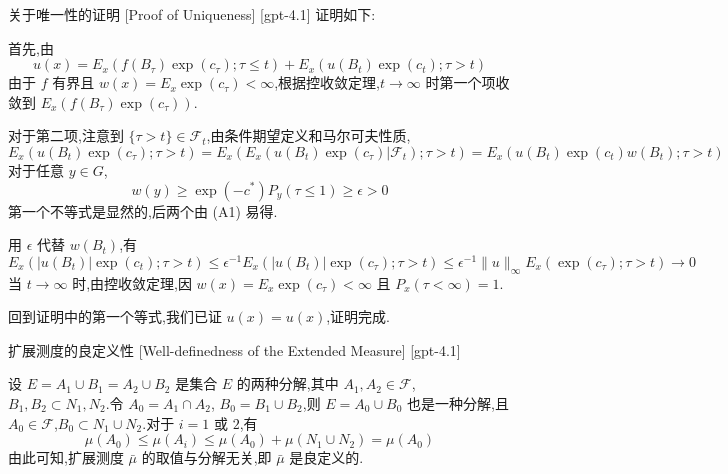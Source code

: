 \documentclass[UTF8]{ctexart}
\begin{document}
    
    
    \begin{prf}
        {关于唯一性的证明}
        [Proof of Uniqueness]
        [gpt-4.1]
        证明如下:

首先,由
\[
u ( x ) = E _ { x } ( f ( B _ { \tau } ) \exp ( c _ { \tau } ) ; \tau \leq t ) + E _ { x } ( u ( B _ { t } ) \exp ( c _ { t } ) ; \tau > t )
\]
由于 $f$ 有界且 $w(x) = E_x \exp(c_{\tau}) < \infty$,根据控收敛定理,$t \to \infty$ 时第一个项收敛到 $E_x (f(B_\tau) \exp(c_\tau))$.

对于第二项,注意到 $\{\tau > t\} \in \mathcal{F}_t$,由条件期望定义和马尔可夫性质,
\[
E_x(u(B_t)\exp(c_\tau); \tau > t) = E_x(E_x(u(B_t)\exp(c_\tau)|\mathcal{F}_t); \tau > t) = E_x(u(B_t)\exp(c_t)w(B_t); \tau > t)
\]
对于任意 $y \in G$,
\[
w(y) \geq \exp(-c^*) P_y(\tau \leq 1) \geq \epsilon > 0
\]
第一个不等式是显然的,后两个由 (A1) 易得.

用 $\epsilon$ 代替 $w(B_t)$,有
\[
E_x(|u(B_t)|\exp(c_t); \tau > t) \leq \epsilon^{-1} E_x(|u(B_t)|\exp(c_\tau); \tau > t) \leq \epsilon^{-1} \|u\|_\infty E_x(\exp(c_\tau); \tau > t) \to 0
\]
当 $t \to \infty$ 时,由控收敛定理,因 $w(x)=E_x\exp(c_\tau)<\infty$ 且 $P_x(\tau<\infty)=1$.

回到证明中的第一个等式,我们已证 $u(x) = 
u(x)$,证明完成.

    \end{prf}
    
    
    
    \begin{thm}
        {扩展测度的良定义性}
        [Well-definedness of the Extended Measure]
        [gpt-4.1]
        
设 $E = A_1 \cup B_1 = A_2 \cup B_2$ 是集合 $E$ 的两种分解,其中 $A_1, A_2 \in \mathcal{F}$,$B_1, B_2 \subset N_1, N_2$.令 $A_0 = A_1 \cap A_2$, $B_0 = B_1 \cup B_2$,则 $E = A_0 \cup B_0$ 也是一种分解,且 $A_0 \in \mathcal{F}$,$B_0 \subset N_1 \cup N_2$.对于 $i=1$ 或 $2$,有
\[
\mu(A_0) \le \mu(A_i) \le \mu(A_0) + \mu(N_1 \cup N_2) = \mu(A_0)
\]
由此可知,扩展测度 $\bar{\mu}$ 的取值与分解无关,即 $\bar{\mu}$ 是良定义的.

    \end{thm}
    
    
    
\end{document}
